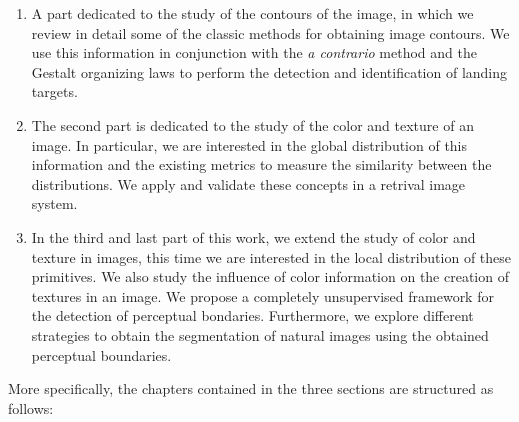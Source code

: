 \begin{enumerate}
	\item A part dedicated to the study of the contours of the image, in which we review in detail some of the classic methods for obtaining image contours. We use this information in conjunction with the \textit{a contrario} method and the Gestalt organizing laws to perform the detection and identification of landing targets.
	\item The second part is dedicated to the study of the color and texture of an image. In particular, we are interested in the global distribution of this information and the existing metrics to measure the similarity between the distributions. We apply and validate these concepts in a retrival image system.
	\item In the third and last part of this work, we extend the study of color and texture in images, this time we are interested in the local distribution of these primitives. We also study the influence of color information on the creation of textures in an image. We propose a completely unsupervised framework for the detection of perceptual bondaries. Furthermore, we explore different strategies to obtain the segmentation of natural images using the obtained perceptual boundaries.
\end{enumerate}

More specifically, the chapters contained in the three sections are structured as follows:

